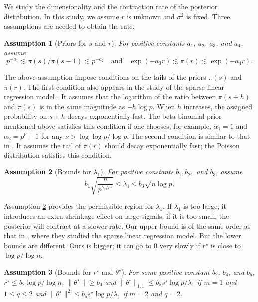 \documentclass[pdftex, noinfoline, letter]{imsart}
\theoremstyle{plain}
\newtheorem{assumption}{Assumption}
\begin{document}
We study the dimensionality and the contraction rate of the posterior distribution. In this study, we assume $r$ is unknown and $\sigma^2$ is fixed. Three assumptions are needed to obtain the rate.

\begin{assumption}[Priors for $s$ and $r$] 
\label{assumps}
For positive constants $a_1$, $a_2$, $a_3$, and $a_4$, assume
$$p^{-a_1} \lesssim \pi(s)/\pi(s-1) \lesssim p^{-a_2}\quad \text{and}\quad \exp(-a_3 r) \lesssim \pi(r) \lesssim \exp(- a_4 r).$$
\end{assumption}

The above assumption impose conditions on the tails of the priors $\pi(s)$ and $\pi(r)$.
The first condition also appears in the study of the sparse linear regression model \citep[e.g.][]{cast15, martin17, ning20}. It assumes that the logarithm of the ratio between $\pi(s+h)$ and $\pi(s)$ is in the same magnitude as $-h\log p$.
When $h$ increases, the assigned probability on $s+h$ decays exponentially fast. 
The beta-binomial prior mentioned above satisfies this condition if one chooses, for example, $\alpha_1 = 1$ and $\alpha_2 = p^{\nu} + 1$ for any $\nu > \log \log p/ \log p$.
The second condition is similar to that in \citet{pati14}. It assumes the tail of $\pi(r)$ should decay exponentially fast; the Poisson distribution satisfies this condition.

\begin{assumption}[Bounds for $\lambda_1$]
\label{assump:lambda1}
For positive constants $b_1, b_2,$ and $b_3$, assume
    $$
    b_1 \sqrt{\frac{n}{p^{b_2/r^\star}}} 
    \leq \lambda_1 \leq 
    b_3 \sqrt{n\log p}.
    $$
\end{assumption}

Assumption \ref{assump:lambda1} provides the permissible region for $\lambda_1$.
If $\lambda_1$ is too large, it introduces an extra shrinkage effect on large signals; if it is too small, the posterior will contract at a slower rate.
Our upper bound is of the same order as that in \citet{cast15}, where they studied the sparse linear regression model. But the lower bounds are different. Ours is bigger; it can go to 0 very slowly if $r^\star$ is close to $\log p/\log n$. 

\begin{assumption}[Bounds for $r^\star$ and $\theta^\star$]
\label{assump:truevalue}
For some positive constant $b_2$, $b_4$, and $b_5$, $r^\star \leq b_2\log p/\log n$,
    $\|\theta^\star\| \geq b_4$ and $\|\theta^\star\|_{1,1} \leq b_5 s^\star \log p/\lambda_1$ if $m = 1$ and $1\leq q\leq 2$ and $\|\theta^\star\|^2 \leq b_5 s^\star \log p/\lambda_1$ if $m = 2$ and $q = 2$.
\end{assumption}
\end{document}
